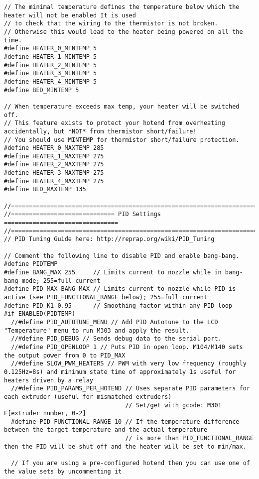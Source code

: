 \begin{lstlisting}
// The minimal temperature defines the temperature below which the heater will not be enabled It is used
// to check that the wiring to the thermistor is not broken.
// Otherwise this would lead to the heater being powered on all the time.
#define HEATER_0_MINTEMP 5
#define HEATER_1_MINTEMP 5
#define HEATER_2_MINTEMP 5
#define HEATER_3_MINTEMP 5
#define HEATER_4_MINTEMP 5
#define BED_MINTEMP 5

// When temperature exceeds max temp, your heater will be switched off.
// This feature exists to protect your hotend from overheating accidentally, but *NOT* from thermistor short/failure!
// You should use MINTEMP for thermistor short/failure protection.
#define HEATER_0_MAXTEMP 285
#define HEATER_1_MAXTEMP 275
#define HEATER_2_MAXTEMP 275
#define HEATER_3_MAXTEMP 275
#define HEATER_4_MAXTEMP 275
#define BED_MAXTEMP 135

//===========================================================================
//============================= PID Settings ================================
//===========================================================================
// PID Tuning Guide here: http://reprap.org/wiki/PID_Tuning

// Comment the following line to disable PID and enable bang-bang.
#define PIDTEMP
#define BANG_MAX 255     // Limits current to nozzle while in bang-bang mode; 255=full current
#define PID_MAX BANG_MAX // Limits current to nozzle while PID is active (see PID_FUNCTIONAL_RANGE below); 255=full current
#define PID_K1 0.95      // Smoothing factor within any PID loop
#if ENABLED(PIDTEMP)
  //#define PID_AUTOTUNE_MENU // Add PID Autotune to the LCD "Temperature" menu to run M303 and apply the result.
  //#define PID_DEBUG // Sends debug data to the serial port.
  //#define PID_OPENLOOP 1 // Puts PID in open loop. M104/M140 sets the output power from 0 to PID_MAX
  //#define SLOW_PWM_HEATERS // PWM with very low frequency (roughly 0.125Hz=8s) and minimum state time of approximately 1s useful for heaters driven by a relay
  //#define PID_PARAMS_PER_HOTEND // Uses separate PID parameters for each extruder (useful for mismatched extruders)
                                  // Set/get with gcode: M301 E[extruder number, 0-2]
  #define PID_FUNCTIONAL_RANGE 10 // If the temperature difference between the target temperature and the actual temperature
                                  // is more than PID_FUNCTIONAL_RANGE then the PID will be shut off and the heater will be set to min/max.

  // If you are using a pre-configured hotend then you can use one of the value sets by uncommenting it


\end{lstlisting}
